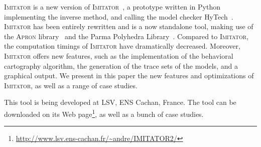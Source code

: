 \documentclass[a4paper,10pt]{article}
\newcommand{\apron}{\textsc{Apron}}
\newcommand{\hytech}{{\sc HyTech}}
\newcommand{\imitator}{\textsc{Imitator}}
\newcommand{\python}{Python}
\begin{document}
\imitator{} is a new version of \imitator{}~\cite{and09}, a prototype written in \python{} implementing the inverse method, and calling the model checker \hytech{}~\cite{hhw97}.
\imitator{} has been entirely rewritten and is a now standalone tool, making use of the \apron{} library~\cite{jm09} and the Parma Polyhedra Library~\cite{bhz08}.
Compared to \imitator{}, the computation timings of \imitator{} have dramatically decreased.
Moreover, \imitator{} offers new features, such as the implementation of the behavioral cartography algorithm, the generation of the trace sets of the models, and a graphical output.
We present in this paper the new features and optimizations of \imitator{}, as well as a range of case studies.

This tool is being developed at LSV, ENS Cachan, France.
The tool can be downloaded on its Web page\footnote{\url{http://www.lsv.ens-cachan.fr/~andre/IMITATOR2/}}, as well as a bunch of case studies.



\end{document}

